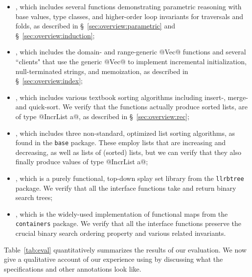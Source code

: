 \begin{itemize}
\item \benchToy, which includes several functions demonstrating 
parametric reasoning with base values, type classes, and higher-order 
loop invariants for traversals and folds, as described in
\S~\ref{sec:overview:parametric} and \S~\ref{sec:overview:induction};

\item \benchVec, which includes the domain- and range-generic @Vec@
  functions and several ``clients"
  that use the generic @Vec@ to implement incremental initialization,
  null-terminated strings, and memoization, as described in
  \S~\ref{sec:overview:index};

\item \benchSort, which includes various textbook sorting algorithms
including insert-, merge- and quick-sort. We verify that the functions
actually produce sorted lists, \ie are of type @IncrList a@, as described in
\S~\ref{sec:overview:rec};

\item \benchGsort, which includes three non-standard, optimized list 
sorting algorithms, as found in the \verb+base+ package. 
These employ lists that are increasing and decreasing, as well as 
lists of (sorted) lists, but we can verify that they also finally 
produce values of type @IncrList a@;

\item \benchSplay, which is a purely functional, top-down splay set 
library from the \verb+llrbtree+ package. We verify that all the 
interface functions take and return binary search trees;

\item \benchMap, which is the widely-used implementation of functional
maps from the \verb+containers+ package. We verify that all the interface
functions preserve the crucial binary search ordering property and various
related invariants.
\end{itemize}
%
Table~\ref{tab:eval} quantitatively summarizes the results of our
evaluation.
%
We now give a qualitative account of our experience using \toolname
by discussing what the specifications and other annotations look like.

